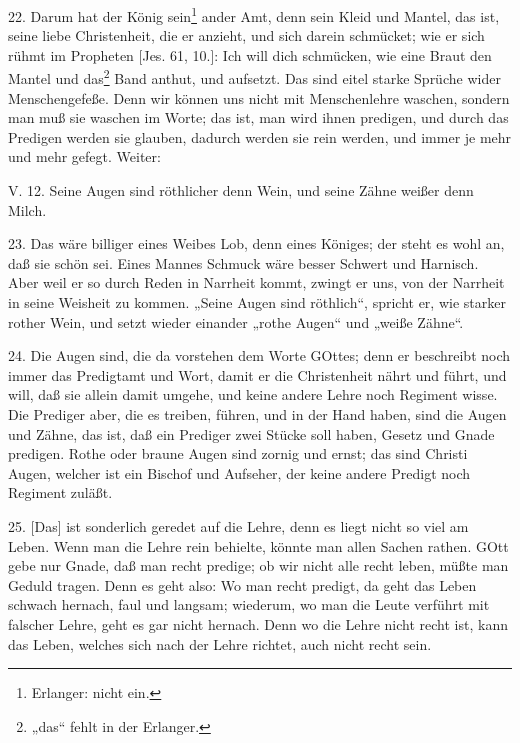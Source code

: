 22. Darum hat der König sein\footnote{Erlanger: nicht ein.} ander Amt, denn sein Kleid und Mantel, das ist, seine liebe Christenheit, die er anzieht, und sich darein schmücket; wie er sich rühmt im Propheten [Jes. 61, 10.]: Ich will dich schmücken, wie eine Braut den Mantel und das\footnote{„das“ fehlt in der Erlanger.} Band anthut, und aufsetzt. Das sind eitel starke Sprüche wider Menschengefeße. Denn wir können uns nicht mit Menschenlehre waschen, sondern man muß sie waschen im Worte; das ist, man wird ihnen predigen, und durch das Predigen werden sie glauben, dadurch werden sie rein werden, und immer je mehr und mehr gefegt. Weiter:

\begin{schriftzitat}
V. 12. Seine Augen sind röthlicher denn Wein, und seine Zähne weißer denn Milch.
\end{schriftzitat}

23. Das wäre billiger eines Weibes Lob, denn eines Königes; der steht es wohl an, daß sie schön sei. Eines Mannes Schmuck wäre besser Schwert und Harnisch. Aber weil er so durch Reden in Narrheit kommt, zwingt er uns, von der Narrheit in seine Weisheit zu kommen. „Seine Augen sind röthlich“, spricht er, wie starker rother Wein, und setzt wieder einander „rothe Augen“ und „weiße Zähne“.

24. Die Augen sind, die da vorstehen dem Worte GOttes; denn er beschreibt noch immer das Predigtamt und Wort, damit er die Christenheit nährt und führt, und will, daß sie allein damit umgehe, und keine andere Lehre noch Regiment wisse. Die Prediger aber, die es treiben, führen, und in der Hand haben, sind die Augen und Zähne, das ist, daß ein Prediger zwei Stücke soll haben, Gesetz und Gnade predigen. Rothe oder braune Augen sind zornig und ernst; das sind Christi Augen, welcher ist ein Bischof und Aufseher, der keine andere Predigt noch Regiment zuläßt.

25. [Das] ist sonderlich geredet auf die Lehre, denn es liegt nicht so viel am Leben. Wenn man die Lehre rein behielte, könnte man allen Sachen rathen. GOtt gebe nur Gnade, daß man recht predige; ob wir nicht alle recht leben, müßte man Geduld tragen. Denn es geht also: Wo man recht predigt, da geht das Leben schwach hernach, faul und langsam; wiederum, wo man die Leute verführt mit falscher Lehre, geht es gar nicht hernach. Denn wo die Lehre nicht recht ist, kann das Leben, welches sich nach der Lehre richtet, auch nicht recht sein.

